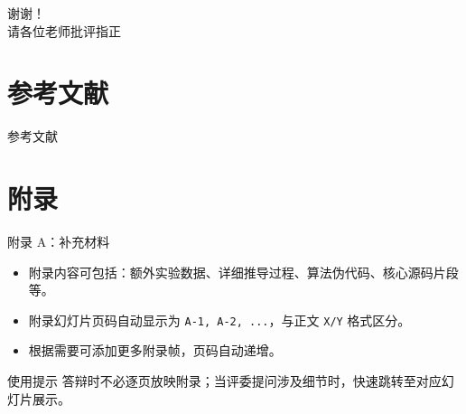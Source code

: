 \documentclass[aspectratio=169]{beamer}
\begin{document}

\begin{frame}[c]{}
  \centering
  \Huge 谢谢！\\[0.5em]
  \Large 请各位老师批评指正
\end{frame}


\section*{参考文献}

\begin{frame}[allowframebreaks]{参考文献}
  \nocite{*}
  \printbibliography
\end{frame}


\appendix

\section{附录}

\begin{frame}{附录 A：补充材料}
  \begin{itemize}
    \item 附录内容可包括：额外实验数据、详细推导过程、算法伪代码、核心源码片段等。
    \item 附录幻灯片页码自动显示为 \texttt{A-1, A-2, ...}，与正文 \texttt{X/Y} 格式区分。
    \item 根据需要可添加更多附录帧，页码自动递增。
  \end{itemize}

  \vspace{1em}
  \begin{block}{使用提示}
    答辩时不必逐页放映附录；当评委提问涉及细节时，快速跳转至对应幻灯片展示。
  \end{block}
\end{frame}
\end{document}
